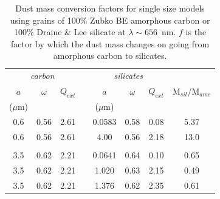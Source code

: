 \begin{table}
	\caption{Dust mass conversion factors for single size models using  
grains of 100\% Zubko BE amorphous carbon or 100\% Draine \& Lee silicate 
at $\lambda \sim 656$~nm. $f$ is the factor by which the dust mass 
changes on going from amorphous carbon to silicates.}
	\label{tb_sil}
	\centering
  	\begin{tabular}{@{} cccccccc @{}}
    	\hline
	\multicolumn{3}{c}{\textit{carbon}} && \multicolumn{3}{c}{\textit{silicates}} & \\
$a$ &$\omega$ &  $Q_{ext}$ & &$a$&$\omega$ & $Q_{ext}$ & M$_{sil}$/M$_{amc}$ \\
($\mu$m) &&&&($\mu$m)\\
\hline
0.6 & 0.56 & 2.61 & &0.0583 & 0.58 &0.08 & 5.37 \\
0.6 &0.56 & 2.61 & &4.00 & 0.56 & 2.18 & 13.0 \\
 \\
3.5 & 0.62 &2.21 & &0.0641 & 0.64 & 0.10 & 0.65 \\
3.5 & 0.62 &2.21 & &1.020 & 0.63 & 2.15 & 0.49 \\
3.5 & 0.62 & 2.21 & &1.376 & 0.62 & 2.35 & 0.61 \\


    \hline
  \end{tabular}
\end{table}


